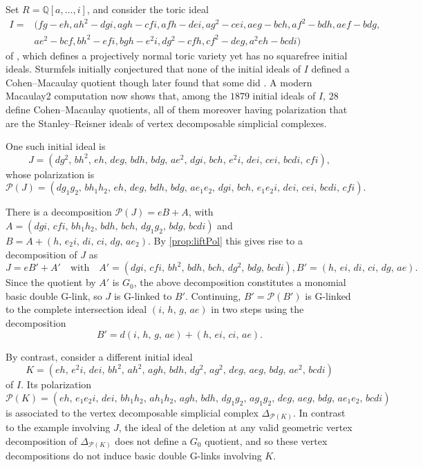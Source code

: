 \documentclass[12pt, reqno]{amsart}
\numberwithin{equation}{section}
\newtheorem{Main Conjecture}[theorem]{Main Conjecture}
\theoremstyle{definition}
\newenvironment{example}
  {\pushQED{\qed}\renewcommand{\qedsymbol}{$\diamondsuit$}\examplex}
  {\popQED\endexamplex}
\theoremstyle{plain}
\newcommand{\QQ}{\mathbb{Q}}
\renewcommand{\P}{\mathcal{P}}
\newcommand{\qwith}{\quad \mbox{with} \quad}
\begin{document}
\begin{example}
Set $R = \QQ[a,\ldots,i]$, and consider the toric ideal 
\begin{eqnarray*}
I =&(fg-eh, ah^2-dgi, agh-cfi, afh-dei, ag^2-cei, aeg-bch, af^2-bdh, aef-bdg, \\ 
& ae^2-bcf, 
 bh^2-efi, bgh-e^2i, dg^2-cfh, cf^2-deg, a^2eh-bcdi)
\end{eqnarray*}
of \cite[Example 13.17]{Stu96}, which defines a projectively normal toric variety yet has no squarefree initial ideals.  Sturmfels initially conjectured that none of the initial ideals of $I$ defined a Cohen--Macaulay quotient though later found that some did \cite[Section 4]{Stu00}.  A modern Macaulay2 \cite{M2} computation now shows that, among the $1879$ initial ideals of $I$, $28$ define Cohen--Macaulay quotients, all of them moreover having polarization that are the Stanley--Reisner ideals of vertex decomposable simplicial complexes. 

One such initial ideal is \[
J =\left(dg^{2},\,bh^{2},\,eh,\,deg,\,bdh,\,bdg,\,ae^{2},\,dgi,\,bch,\,e^{2}i,\,dei,\,cei,\,bcdi,\,cfi\right)
,\] whose polarization is \[
\P(J)=\left(dg_1g_2,\,bh_1h_2,\,eh,\,deg,\,bdh,\,bdg,\,ae_1e_2,\,dgi,\,bch,\,e_1e_2i,\,dei,\,cei,\,bcdi,\,cfi\right).
\] 

\noindent There is a decomposition $\P(J) = eB+A$, with $A=\left(dgi,\,cfi,\,bh_1h_2,\,bdh,\,bch,\,dg_1g_2,\,bdg,\,bcdi\right)$ and $B= A+(h,\,e_2i,\,di,\,ci, \,dg, \,ae_2)$. By \cref{prop:liftPol} this gives rise to a decomposition of $J$ as
\[
J=eB'+A' \qwith A'=\left(dgi,\,cfi,\,bh^2,\,bdh,\,bch,\,dg^2,\,bdg,\,bcdi\right), B'=(h,\,ei,\,di,\,ci, \,dg, \,ae).
\] 
Since the quotient by $A'$ is $G_0$, the above decomposition constitutes a monomial basic double G-link, so $J$ is G-linked to $B'$.
Continuing, $B'=\P(B')$ is G-linked to the complete intersection ideal $\left(i,\,h,\,g,\,ae\right)$ in two steps using the decomposition
\[
B'=d \left(i,\,h,\,g,\,ae\right) + \left( h, \, ei, \, ci,\, ae \right).
\]

By contrast, consider a different initial ideal \[
K =\left(eh,\,e^2i,\,dei,\,bh^2,\,ah^2,\,agh,\,bdh,\,dg^2,\,ag^2,\,deg,\,aeg,\,bdg,\,ae^2,\,bcdi\right)
\]
 of $I$. Its polarization \[\P(K) =\left(eh,\,e_1e_2i,\,dei,\,bh_1h_2,\,ah_1h_2,\,agh,\,bdh,\,dg_1g_2,\,ag_1g_2,\,deg,\,aeg,\,bdg,\,ae_1e_2,\,bcdi\right)\]
is associated to the vertex decomposable simplicial complex $\Delta_{\P(K)}$.  In contrast to the example involving $J$, the ideal of the deletion at any valid geometric vertex decomposition of $\Delta_{\P(K)}$ does not define a $G_0$ quotient, and so these vertex decompositions do not induce basic double G-links involving $K$.
\end{example}
\end{document}

